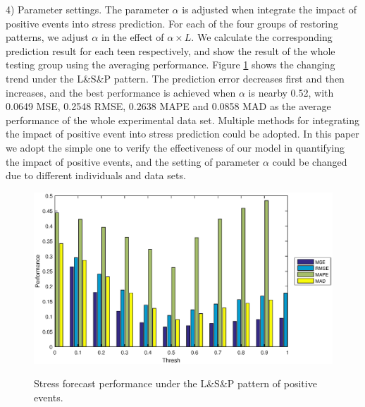 4) Parameter settings.
The parameter $\alpha$ is adjusted when integrate the impact of positive events into stress prediction.
For each of the four groups of restoring patterns,
we adjust $\alpha$ in the effect of $\alpha \times L$.
We calculate the corresponding prediction result for each teen respectively,
and show the result of the whole testing group using the averaging performance.
Figure \ref{fig:thresh} shows the changing trend under the L\&S\&P pattern.
The prediction error decreases first and then increases,
and the best performance is achieved when $\alpha$ is nearby 0.52,
with 0.0649 MSE, 0.2548 RMSE, 0.2638 MAPE and 0.0858 MAD as the average performance of the whole experimental data set.
Multiple methods for integrating the impact of positive event into stress prediction could be adopted.
In this paper we adopt the simple one to verify the effectiveness of our model in quantifying the impact of positive events,
and the setting of parameter $\alpha$ could be changed due to different individuals and data sets.

\begin{figure}[H]
\centering
\caption{Stress forecast performance under the L\&S\&P pattern of positive events.}
\includegraphics[width=0.9\linewidth]{figs/threshNew.eps}
\label{fig:thresh}
\end{figure}



